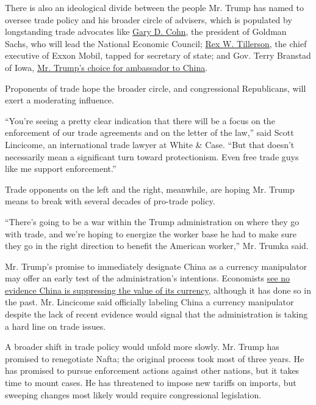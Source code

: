 There is also an ideological divide between the people Mr. Trump has
named to oversee trade policy and his broader circle of advisers, which
is populated by longstanding trade advocates like
\href{https://www.nytimes3xbfgragh.onion/2016/12/12/business/dealbook/goldman-sachs-gary-cohn.html}{Gary
D. Cohn}, the president of Goldman Sachs, who will lead the National
Economic Council;
\href{https://www.nytimes3xbfgragh.onion/2016/12/12/us/politics/rex-tillerson-secretary-of-state-trump.html}{Rex
W. Tillerson}, the chief executive of Exxon Mobil, tapped for secretary
of state; and Gov. Terry Branstad of Iowa,
\href{http://www.nytimes3xbfgragh.onion/2016/12/07/us/politics/terry-branstad-china-ambassador-trump.html?_r=0}{Mr.
Trump's choice for ambassador to China}.

Proponents of trade hope the broader circle, and congressional
Republicans, will exert a moderating influence.

``You're seeing a pretty clear indication that there will be a focus on
the enforcement of our trade agreements and on the letter of the law,''
said Scott Lincicome, an international trade lawyer at White \& Case.
``But that doesn't necessarily mean a significant turn toward
protectionism. Even free trade guys like me support enforcement.''

Trade opponents on the left and the right, meanwhile, are hoping Mr.
Trump means to break with several decades of pro-trade policy.

``There's going to be a war within the Trump administration on where
they go with trade, and we're hoping to energize the worker base he had
to make sure they go in the right direction to benefit the American
worker,'' Mr. Trumka said.

Mr. Trump's promise to immediately designate China as a currency
manipulator may offer an early test of the administration's intentions.
Economists
\href{http://www.nytimes3xbfgragh.onion/2016/10/01/business/dealbook/china-trump-yuan-devaluation.html}{see
no evidence China is suppressing the value of its currency}, although it
has done so in the past. Mr. Lincicome said officially labeling China a
currency manipulator despite the lack of recent evidence would signal
that the administration is taking a hard line on trade issues.

A broader shift in trade policy would unfold more slowly. Mr. Trump has
promised to renegotiate Nafta; the original process took most of three
years. He has promised to pursue enforcement actions against other
nations, but it takes time to mount cases. He has threatened to impose
new tariffs on imports, but sweeping changes most likely would require
congressional legislation.

